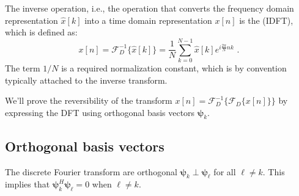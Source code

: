 The inverse operation, i.e., the operation that converts the frequency
domain representation $\hat{x}[k]$ into a time domain representation
$x[n]$ is the  (IDFT), which is
defined as:
\begin{equation}
  \boxed{
  x[n] = \mathcal{F}_D^{-1}\{\hat{x}[k]\} = \frac{1}{N}\sum_{k=0}^{N-1} \hat{x}[k] e^{i\frac{2\pi}{N} nk}
  } \,\,.
\end{equation}
The term $1/N$ is a required normalization constant, which is by
convention typically attached to the inverse transform.

We'll prove the reversibility of the transform
$x[n]=\mathcal{F}_D^{-1}\{\mathcal{F}_D\{x[n]\}\}$ by expressing the DFT
using orthogonal basis vectors $\bm{\psi}_k$.

\subsection{Orthogonal basis vectors}

\usetikzlibrary{calc,angles,quotes}
\usetikzlibrary{quotes,angles}
\begin{marginfigure}
  \begin{center}
  \end{center}
  \caption{The discrete Fourier transform  are
  orthogonal $\bm{\psi}_{k} \perp \bm{\psi}_{\ell}$ for all $\ell \ne k$.
  This implies that $\bm{\psi}_k^{H}\bm{\psi}_{\ell} = 0$ when $\ell \ne k$.}
\end{marginfigure}

